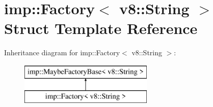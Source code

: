 \hypertarget{structimp_1_1_factory_3_01v8_1_1_string_01_4}{}\section{imp\+:\+:Factory$<$ v8\+:\+:String $>$ Struct Template Reference}
\label{structimp_1_1_factory_3_01v8_1_1_string_01_4}
Inheritance diagram for imp\+:\+:Factory$<$ v8\+:\+:String $>$\+:\begin{figure}[H]
\begin{center}
\leavevmode
\includegraphics[height=2.000000cm]{structimp_1_1_factory_3_01v8_1_1_string_01_4}
\end{center}
\end{figure}
